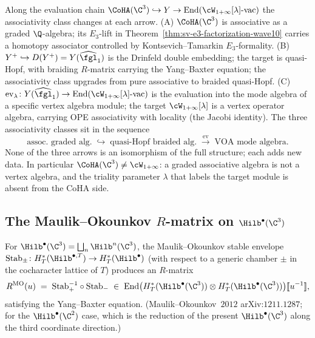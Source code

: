 \begin{remark}
\label{rem:three-associativity-classes-wave10}
Along the evaluation chain $\CoHA(\C^3) \hookrightarrow Y \to
\mathrm{End}(\cW_{1+\infty}[\lambda]\text{-vac})$ the associativity class
changes at each arrow. (A) $\CoHA(\C^3)$ is associative as a
graded $\Q$-algebra; its $E_3$-lift in
Theorem~\ref{thm:sv-e3-factorization-wave10} carries a homotopy
associator controlled by Kontsevich--Tamarkin $E_3$-formality. (B)
$Y^+ \hookrightarrow D(Y^+) = Y(\widehat{\fgl}_1)$ is the Drinfeld
double embedding; the target is quasi-Hopf, with braiding
$R$-matrix carrying the Yang--Baxter equation; the associativity
class upgrades from pure associative to braided quasi-Hopf. (C)
$\mathrm{ev}_\lambda \colon Y(\widehat{\fgl}_1) \to \mathrm{End}(\cW_{1+\infty}[\lambda]\text{-vac})$
is the evaluation into the mode algebra of a specific vertex algebra
module; the target $\cW_{1+\infty}[\lambda]$ is a vertex operator
algebra, carrying OPE associativity with locality (the Jacobi
identity). The three associativity classes sit in the sequence
\[
 \text{assoc.\ graded alg.}
 \;\hookrightarrow\; \text{quasi-Hopf braided alg.}
 \;\xrightarrow{\mathrm{ev}}\;
 \text{VOA mode algebra}.
\]
None of the three arrows is an isomorphism of the full structure; each
adds new data. In particular $\CoHA(\C^3) \neq \cW_{1+\infty}$: a graded
associative algebra is not a vertex algebra, and the triality parameter
$\lambda$ that labels the target module is absent from the CoHA side.
\end{remark}

\subsection*{The Maulik--Okounkov $R$-matrix on $\Hilb^\bullet(\C^3)$}

\begin{theorem}
\label{thm:mo-stable-envelope-c3-wave10}
\ClaimStatusProvedElsewhere
For $\Hilb^\bullet(\C^3) = \bigsqcup_n \Hilb^n(\C^3)$, the
Maulik--Okounkov stable envelope $\mathrm{Stab}_\pm \colon
H^*_T(\Hilb^{\bullet, T}) \to H^*_T(\Hilb^\bullet)$ (with respect to
a generic chamber $\pm$ in the cocharacter lattice of $T$) produces
an $R$-matrix
\[
 R^{\mathrm{MO}}(u) \;=\; \mathrm{Stab}_+^{-1} \circ \mathrm{Stab}_-
 \;\in\; \mathrm{End}\bigl(H^*_T(\Hilb^\bullet(\C^3)) \otimes
 H^*_T(\Hilb^\bullet(\C^3))\bigr) [\![u^{-1}]\!],
\]
satisfying the Yang--Baxter equation. (Maulik--Okounkov~$2012$
arXiv:$1211.1287$; for the $\Hilb^\bullet(\C^2)$ case, which is the
reduction of the present $\Hilb^\bullet(\C^3)$ along the third
coordinate direction.)
\end{theorem}

